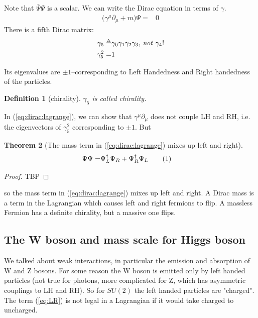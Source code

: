 \documentclass[]{article}
\newcommand\numberthis{\addtocounter{equation}{1}\tag{\theequation}}
\newtheorem{thm}{Theorem}
\newtheorem{defn}[thm]{Definition}
\begin{document}
Note that $\bar{\Psi} \Psi$ is a scalar. We can write the Dirac equation in terms of $\gamma$.
\begin{align*}
	\big(\gamma^\mu \partial_\mu +m  \big) \Psi =& 0
\end{align*}
There is a fifth Dirac matrix:
\begin{align*}
	\gamma_5 \triangleq & \gamma_0 \gamma_1 \gamma_2 \gamma_3 \text{, \emph{not} $\gamma_4$!}\\
	\gamma_5^2 =&1
\end{align*}

Its eigenvalues are $\pm 1$--corresponding to Left Handedness and Right handedness of the particles.

\begin{defn}[chirality]
	$\gamma_5$ is called chirality.
\end{defn}

In (\ref{eq:dirac:lagrange}), we can show that $\gamma^\mu \partial_\mu$  does not couple LH and RH, i.e. the eigenvectors of $\gamma_5^2$ corresponding to $\pm 1$. But

\begin{thm}[The mass term in  (\ref{eq:dirac:lagrange}) mixes up left and right]
	\begin{align*}
		\bar{\Psi}\Psi =& \Psi^\dagger_L \Psi_R + \Psi^\dagger_R \Psi_L \numberthis \label{eq:LR}
	\end{align*}
\end{thm}
\begin{proof}
	TBP
\end{proof}

so the mass term in  (\ref{eq:dirac:lagrange}) mixes up left and right. A Dirac mass is a term in the Lagrangian which causes left and right fermions to flip. A massless Fermion has a definite chirality, but a massive one flips.

\subsection{The W boson and mass scale for Higgs boson}

We talked about weak interactions, in particular the emission and absorption of W and Z bosons. For some reason the W boson is emitted only by left handed particles (not true for photons, more complicated for Z, which has asymmetric couplings to LH and RH). So for $SU(2)$ the left handed particles are "charged". The term (\ref{eq:LR}) is not legal in a Lagrangian if it would take charged to uncharged.
\end{document}
